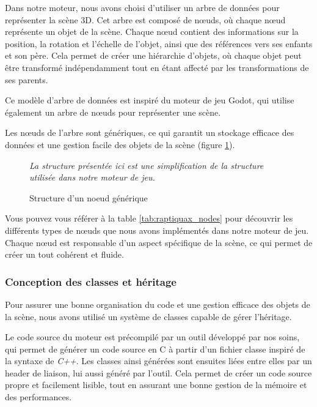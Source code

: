     Dans notre moteur, nous avons choisi d'utiliser un arbre de données
    pour représenter la scène 3D. Cet arbre est composé de n\oe{}uds, où
    chaque n\oe{}ud représente un objet de la scène. Chaque n\oe{}ud
    contient des informations sur la position, la rotation et l'échelle de
    l'objet, ainsi que des références vers ses enfants et son père.
    Cela permet de créer une hiérarchie d'objets, où chaque objet peut
    être transformé indépendamment tout en étant affecté par les
    transformations de ses parents.

    Ce modèle d'arbre de données est inspiré du moteur de jeu Godot, qui
    utilise également un arbre de n\oe{}uds pour représenter une scène.

    Les n\oe{}uds de l'arbre sont génériques, ce qui garantit un stockage
    efficace des données et une gestion facile des objets de la scène (figure \ref{fig:node_structure}).

    \begin{figure}[h]
        \centering
        
        \emph{La structure présentée ici est une simplification de la structure utilisée dans notre moteur de jeu.}
        \caption{Structure d'un noeud générique}
        \label{fig:node_structure}
    \end{figure}

    Vous pouvez vous référer à la table \ref{tab:raptiquax_nodes} pour découvrir
    les différents types de n\oe{}uds que nous avons implémentés dans notre
    moteur de jeu. Chaque n\oe{}ud est responsable d'un aspect spécifique de
    la scène, ce qui permet de créer un tout cohérent et fluide.


\subsubsection{Conception des classes et héritage}

    Pour assurer une bonne organisation du code et une gestion efficace
    des objets de la scène, nous avons utilisé un système de classes capable
    de gérer l'héritage.
    
    Le code source du moteur est précompilé par un outil développé par nos
    soins, qui permet de générer un code source en C à partir d'un fichier
    classe inspiré de la syntaxe de \emph{C++}. Les classes ainsi générées
    sont ensuites liées entre elles par un header de liaison, lui aussi
    généré par l'outil. Cela permet de créer un code source propre et
    facilement lisible, tout en assurant une bonne gestion de la mémoire et des
    performances.

